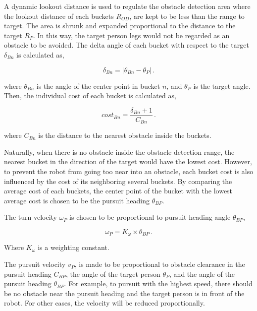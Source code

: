 \documentclass[10 pt,a4paper,conference]{IEEEtran}
\begin{document}
A dynamic lookout distance is used to regulate the obstacle detection
area where the lookout distance of each buckets \(R_{OD}\), are kept to
be less than the range to target. The area is shrunk and expanded
proportional to the distance to the target \(R_P\). In this way, the
target person legs would not be regarded as an obstacle to be avoided.
The delta angle of each bucket with respect to the target
\(\delta_{Bn}\) is calculated as,

\begin{equation}
\delta_{Bn} = |\theta_{Bn}-\theta_{P}|\,. \label{eq:delta}
\end{equation}

where \(\theta_{Bn}\) is the angle of the center point in bucket \(n\),
and \(\theta_{P}\) is the target angle. Then, the individual cost of
each bucket is calculated as,

\begin{equation}
cost_{Bn}=\frac{\delta_{Bn}+1}{C_{Bn}}\,. \label{eq:cost}
\end{equation}

where \(C_{Bn}\) is the distance to the nearest obstacle inside the
buckets.

Naturally, when there is no obstacle inside the obstacle detection
range, the nearest bucket in the direction of the target would have the
lowest cost. However, to prevent the robot from going too near into an
obstacle, each bucket cost is also influenced by the cost of its
neighboring several buckets. By comparing the average cost of each
buckets, the center point of the bucket with the lowest average cost is
chosen to be the pursuit heading \(\theta_{BP}\).

The turn velocity \(\omega_P\) is chosen to be proportional to pursuit
heading angle \(\theta_{BP}\),

\begin{equation}
\omega_P=K_{\omega}\times\theta_{BP}\,. \label{eq:cost}
\end{equation}

Where \(K_{\omega}\) is a weighting constant.

The pursuit velocity \(v_P\), is made to be proportional to obstacle
clearance in the pursuit heading \(C_{BP}\), the angle of the target
person \(\theta_P\), and the angle of the pursuit heading
\(\theta_{BP}\). For example, to pursuit with the highest speed, there
should be no obstacle near the pursuit heading and the target person is
in front of the robot. For other cases, the velocity will be reduced
proportionally.
\end{document}
